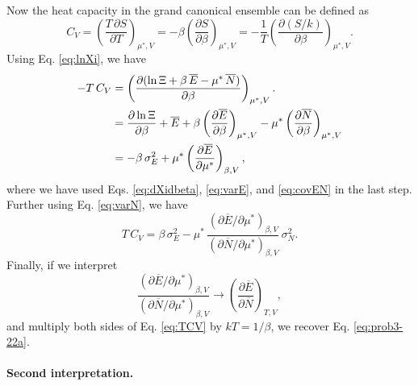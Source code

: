 \documentclass{article}
\begin{document}
Now the heat capacity in the grand canonical ensemble can be defined as
%
\begin{equation}
C_V
= \left( \frac{ T \, \partial S } { \partial T } \right)_{\mu^*, V}
= -\beta \left( \frac{ \partial S } { \partial \beta } \right)_{\mu^*, V}
= -\frac{1}{T} \left( \frac{ \partial (S/k) } { \partial \beta } \right)_{\mu^*, V}.
\label{eq:CV_def}
\end{equation}
%
Using Eq. \eqref{eq:lnXi}, we have
\begin{align}
-T \, C_V
  &= \left( \frac{ \partial (\ln \Xi + \beta \, \overline E - \mu^* \, \overline N) }
  { \partial \beta } \right)_{\mu^*, V}.
  \notag
  \\
  &= \frac{ \partial \ln \Xi } { \partial \beta }
  + \overline E
  + \beta \left( \frac{ \partial \overline E } { \partial \beta } \right)_{\mu^*, V}
  - \mu^* \left( \frac{ \partial \overline N } { \partial \beta } \right)_{\mu^*, V}
  \notag
  \\
  &=
  - \beta \, \sigma_E^2
  + \mu^* \left( \frac{ \partial \overline E } { \partial \mu^* } \right)_{\beta, V}
  ,
  \notag
\end{align}
%
where we have used Eqs. \eqref{eq:dXidbeta}, \eqref{eq:varE}, and \eqref{eq:covEN}
in the last step.
%
Further using Eq. \eqref{eq:varN}, we have
\begin{equation}
T \, C_V
=
\beta \, \sigma_E^2
-
\mu^* \,
\frac{ \left( \partial \overline E / \partial \mu^* \right)_{\beta, V} }
     { \left( \partial \overline N / \partial \mu^* \right)_{\beta, V} }
\, \sigma_N^2
.
\label{eq:TCV}
\end{equation}
Finally, if we interpret
$$
\frac{ \left( \partial \overline E / \partial \mu^* \right)_{\beta, V} }
     { \left( \partial \overline N / \partial \mu^* \right)_{\beta, V} }
\to
\left(
  \frac{ \partial \overline E }
       { \partial \overline N }
\right)_{T, V}
,
$$
and multiply both sides of Eq. \eqref{eq:TCV} by $k T = 1/\beta$,
we recover Eq. \eqref{eq:prob3-22a}.

\paragraph{Second interpretation.}
\end{document}
